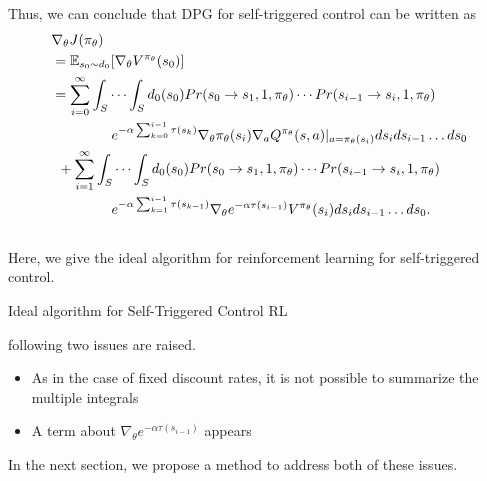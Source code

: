 \documentclass[english, dvipdfmx]{ampmt}             %
\newcommand{\expect}{\mathbb{E}}
\begin{document}
Thus, we can conclude that DPG for self-triggered control can be written as
\begin{align}
	&\nabla_{\theta}J(\pi_{\theta})\nonumber \\
	&= \expect_{s_0\sim d_0}[\nabla_{\theta}V^{\pi_{\theta}}(s_0)]\nonumber\\
	&= \sum_{i=0}^{\infty}\int_{S}\cdots\int_{S}d_0(s_0)Pr(s_0\to s_1,1,\pi_{\theta})\cdots Pr(s_{i-1}\to s_i,1,\pi_{\theta})\nonumber\\
	&\hspace{10ex}e^{-\alpha\sum_{k=0}^{i-1}\tau(s_k)}\nabla_{\theta}\pi_{\theta}(s_i)\nabla_aQ^{\pi_{\theta}}(s,a)|_{a=\pi_{\theta}(s_i)}ds_ids_{i-1}\ldots ds_0\nonumber\\
	&\hspace{1ex}+\sum_{i=1}^{\infty}\int_{S}\cdots\int_{S}d_0(s_0)Pr(s_0\to s_1,1,\pi_{\theta})\cdots Pr(s_{i-1}\to s_i,1,\pi_{\theta})\nonumber\\
	&\hspace{10ex}e^{-\alpha\sum_{k=1}^{i-1}\tau(s_{k-1})}\nabla_{\theta}e^{-\alpha\tau(s_{i-1})}V^{\pi_{\theta}}(s_i)ds_ids_{i-1}\ldots ds_0.
\end{align}\\
Here, we give the ideal algorithm for reinforcement learning for self-triggered control.
\begin{algorithm}                      
\caption{Ideal algorithm for Self-Triggered Control RL}         
\label{alg1}                          
\begin{algorithmic}                  
    \STATE Write me.
    \FOR
    
    \if0{
    \IF{$n < 0$}
    \STATE $X \Leftarrow 1 / x$
    \STATE $N \Leftarrow -n$
    \ELSE
    \STATE $X \Leftarrow x$
    \STATE $N \Leftarrow n$
    \ENDIF
    \WHILE{$N \neq 0$}
    \IF{$N$ is even}
    \STATE $X \Leftarrow X \times X$
    \STATE $N \Leftarrow N / 2$
    \ELSE[$N$ is odd]
    \STATE $y \Leftarrow y \times X$
    \STATE $N \Leftarrow N - 1$
    \ENDIF
    \ENDWHILE
    \fi
\end{algorithmic}
\end{algorithm}





following two issues are raised.
\begin{itemize}
	\item As in the case of fixed discount rates, it is not possible to summarize the multiple integrals
	\item A term about $\nabla_{\theta}e^{-\alpha\tau(s_{i-1})}$ appears
\end{itemize}
In the next section, we propose a method to address both of these issues.
\end{document}
